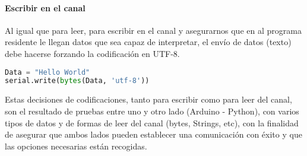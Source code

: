 	
\paragraph {Escribir en el canal} Al igual que para leer, para escribir en el canal y asegurarnos que en al programa residente le llegan datos que sea capaz de interpretar, el envío de datos (texto) debe hacerse forzando la codificación en UTF-8.
\begin{lstlisting}[language=python]
Data = "Hello World"
serial.write(bytes(Data, 'utf-8'))
\end{lstlisting}

Estas decisiones de codificaciones, tanto para escribir como para leer del canal, son el resultado de pruebas entre uno y otro lado (Arduino - Python), con varios tipos de datos y de formas de leer del canal (bytes, Strings, etc), con la finalidad de asegurar que ambos lados pueden establecer una comunicación con éxito y que las opciones necesarias están recogidas.

